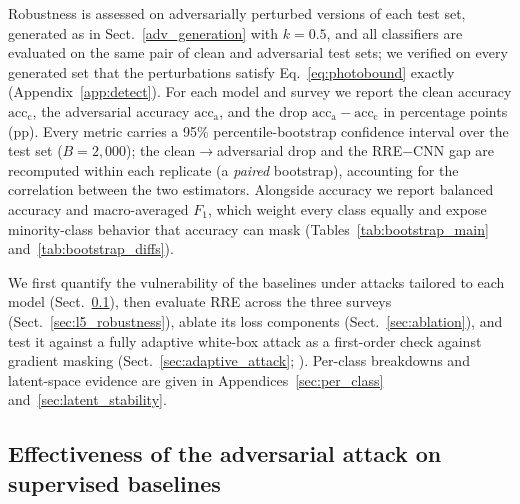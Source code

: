 \documentclass{aa}
\begin{document}
Robustness is assessed on adversarially perturbed versions of each test set, generated as in Sect.~\ref{adv_generation} with $k = 0.5$, and all classifiers are evaluated on the same pair of clean and adversarial test sets; we verified on every generated set that the perturbations satisfy Eq.~\eqref{eq:photobound} exactly (Appendix~\ref{app:detect}). For each model and survey we report the clean accuracy $\mathrm{acc}_{\mathrm{c}}$, the adversarial accuracy $\mathrm{acc}_{\mathrm{a}}$, and the drop $\mathrm{acc}_{\mathrm{a}} - \mathrm{acc}_{\mathrm{c}}$ in percentage points (pp). Every metric carries a 95\% percentile-bootstrap confidence interval over the test set ($B=2{,}000$); the clean$\to$adversarial drop and the RRE$-$CNN gap are recomputed within each replicate (a \emph{paired} bootstrap), accounting for the correlation between the two estimators. Alongside accuracy we report balanced accuracy and macro-averaged $F_1$, which weight every class equally and expose minority-class behavior that accuracy can mask (Tables~\ref{tab:bootstrap_main} and~\ref{tab:bootstrap_diffs}).

We first quantify the vulnerability of the baselines under attacks tailored to each model (Sect.~\ref{sec:attack_effectiveness}), then evaluate RRE across the three surveys (Sect.~\ref{sec:l5_robustness}), ablate its loss components (Sect.~\ref{sec:ablation}), and test it against a fully adaptive white-box attack as a first-order check against gradient masking (Sect.~\ref{sec:adaptive_attack}; \citealt{athalye2018obfuscated,carlini2019evaluating}). Per-class breakdowns and latent-space evidence are given in Appendices~\ref{sec:per_class} and~\ref{sec:latent_stability}.

\subsection{Effectiveness of the adversarial attack on supervised baselines}
\label{sec:attack_effectiveness}

\end{document}
